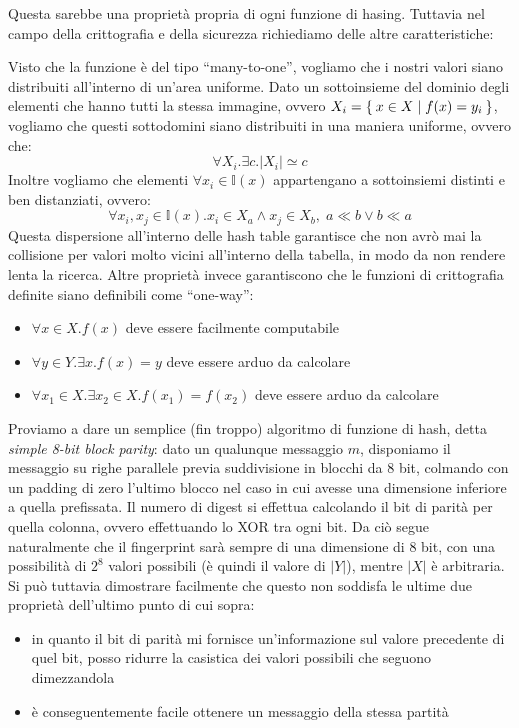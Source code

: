 Questa sarebbe una proprietà propria di ogni funzione di hasing. Tuttavia nel
campo della crittografia e della sicurezza richiediamo delle altre caratteristiche:
\begin{itemize}
\diam Visto che la funzione è del tipo ``many-to-one'', vogliamo che i nostri
	valori siano distribuiti all'interno di un'area uniforme.
	Dato un sottoinsieme del dominio degli elementi che hanno tutti la stessa
	immagine, ovvero $X_i=\Set{x\in X|f(x)=y_i}$, vogliamo che questi sottodomini
	siano distribuiti in una maniera uniforme, ovvero che:
	\[\forall X_i.\exists c. |X_i|\simeq c\]
\diam Inoltre vogliamo che elementi $\forall x_i\in \mathbb I(x)$ appartengano
	a sottoinsiemi distinti e ben distanziati, ovvero:
	\[\forall x_i,x_j\in\mathbb I(x).x_i\in X_a\wedge x_j\in X_b,\; a\ll b \vee b\ll a\] 
	Questa dispersione all'interno delle hash table garantisce che non 
	avrò mai la collisione per valori molto vicini all'interno della tabella,
	in modo da non rendere lenta la ricerca.
\diam Altre proprietà invece garantiscono che le funzioni di crittografia definite
	siano definibili come ``one-way'':
	\begin{itemize}
	\item $\forall x\in X. f(x)$ deve essere facilmente computabile
	\item $\forall y\in Y. \exists x. f(x)=y$ deve essere arduo da calcolare
	\item $\forall x_1\in X. \exists x_2\in X. f(x_1)=f(x_2)$ deve essere arduo da calcolare
	\end{itemize}
\end{itemize}

Proviamo a dare un semplice (fin troppo) algoritmo di funzione di hash, detta
\textit{simple 8-bit block parity}: dato un qualunque messaggio $m$, disponiamo il
messaggio su righe parallele previa suddivisione in blocchi da 8 bit, colmando
con un padding di zero l'ultimo blocco nel caso in cui avesse una dimensione inferiore
a quella prefissata. Il numero di digest si effettua calcolando il bit di parità
per quella colonna, ovvero effettuando lo XOR tra ogni bit. Da ciò segue naturalmente
che il fingerprint sarà sempre di una dimensione di 8 bit, con una possibilità
di $2^8$ valori possibili (è quindi il valore di $|Y|$), mentre $|X|$ è arbitraria.
Si può tuttavia dimostrare facilmente che questo non soddisfa le ultime due proprietà
dell'ultimo punto di cui sopra:
\begin{itemize}
\item in quanto il bit di parità mi fornisce un'informazione sul valore precedente
	di quel bit, posso ridurre la casistica dei valori possibili che seguono
	dimezzandola
\item è conseguentemente facile ottenere un messaggio della stessa partità
\end{itemize}

